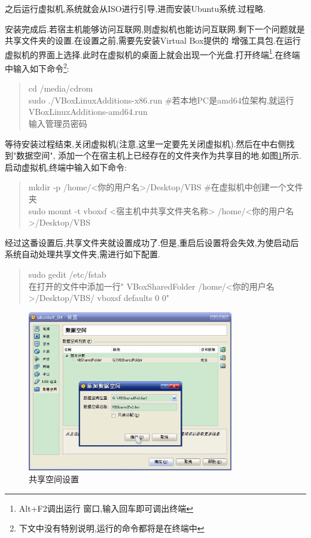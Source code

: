 \documentclass[12pt,a4paper,titlepage]{article}
\begin{document}
之后运行虚拟机,系统就会从ISO进行引导,进而安装Ubuntu系统.过程略.

安装完成后.若宿主机能够访问互联网,则虚拟机也能访问互联网.剩下一个问题就是共享文件夹的设置.在设置之前,需要先安装Virtual Box提供的
增强工具包.在运行虚拟机的界面上选择.此时在虚拟机的桌面上就会出现一个光盘.打开终端\footnote{Alt+F2调出运行
窗口,输入回车即可调出终端}.在终端中输入如下命令\footnote{下文中没有特别说明,运行的命令都将是在终端中}:
\begin{verse}
cd /media/cdrom\\sudo ./VBoxLinuxAdditions-x86.run \#若本地PC是amd64位架构,就运行VBoxLinuxAdditions-amd64.run\\输入管理员密码
\end{verse}
等待安装过程结束,关闭虚拟机{(注意,这里一定要先关闭虚拟机)}.然后在中右侧找到"数据空间",
添加一个在宿主机上已经存在的文件夹作为共享目的地.如图\ref{f_sf}所示.
启动虚拟机,终端中输入如下命令:
\begin{verse}
mkdir -p /home/<你的用户名>/Desktop/VBS \#在虚拟机中创建一个文件夹\\sudo mount -t vboxsf <宿主机中共享文件夹名称> 
/home/<你的用户名>/Desktop/VBS
\end{verse}
经过这番设置后,共享文件夹就设置成功了.但是,重启后设置将会失效,为使启动后系统自动处理共享文件夹,需进行如下配置.
\begin{verse}\label{cmd0}
sudo gedit /etc/fstab\\在打开的文件中添加一行" VBoxSharedFolder  /home/<你的用户名>/Desktop/VBS/  vboxsf  defaults 0 0"
\end{verse}
\begin{figure}[!bthp]
\centering
\includegraphics[width=0.8\textwidth,scale=0.8]{pic/f_vb_setting_sf.eps}
\caption{共享空间设置\label{f_sf}}
\end{figure}
\end{document}
